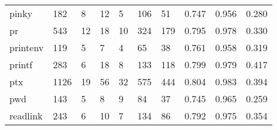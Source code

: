 \begin{longtable}{lp{1.3cm}p{1.3cm}p{1.3cm}p{1.3cm}p{1.3cm}p{1.3cm}p{1.3cm}p{1.3cm}p{1.3cm}}
pinky     &                    182 &                                  8 &                                12 &                                5 &                               106 &                              51 &                                   0.747 &                                  0.956 &                                0.280 \\
pr        &                    543 &                                 12 &                                18 &                               10 &                               324 &                             179 &                                   0.795 &                                  0.978 &                                0.330 \\
printenv  &                    119 &                                  5 &                                 7 &                                4 &                                65 &                              38 &                                   0.761 &                                  0.958 &                                0.319 \\
printf    &                    283 &                                  6 &                                18 &                                8 &                               133 &                             118 &                                   0.799 &                                  0.979 &                                0.417 \\
ptx       &                   1126 &                                 19 &                                56 &                               32 &                               575 &                             444 &                                   0.804 &                                  0.983 &                                0.394 \\
pwd       &                    143 &                                  5 &                                 8 &                                9 &                                84 &                              37 &                                   0.745 &                                  0.965 &                                0.259 \\
readlink  &                    243 &                                  6 &                                10 &                                7 &                               134 &                              86 &                                   0.792 &                                  0.975 &                                0.354 \\

\end{longtable}
